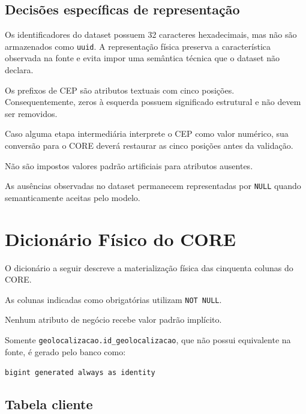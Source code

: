 \documentclass[12pt,a4paper]{article}
\begin{document}
	\subsection{Decisões específicas de representação}
	
	Os identificadores do dataset possuem 32 caracteres hexadecimais, mas
	não são armazenados como \texttt{uuid}. A representação física
	preserva a característica observada na fonte e evita impor uma
	semântica técnica que o dataset não declara.
	
	Os prefixos de CEP são atributos textuais com cinco posições.
	Consequentemente, zeros à esquerda possuem significado estrutural e
	não devem ser removidos.
	
	Caso alguma etapa intermediária interprete o CEP como valor numérico,
	sua conversão para o CORE deverá restaurar as cinco posições antes da
	validação.
	
	Não são impostos valores padrão artificiais para atributos ausentes.
	
	As ausências observadas no dataset permanecem representadas por
	\texttt{NULL} quando semanticamente aceitas pelo modelo.
	
	\section{Dicionário Físico do CORE}
	
	O dicionário a seguir descreve a materialização física das cinquenta
	colunas do CORE.
	
	As colunas indicadas como obrigatórias utilizam \texttt{NOT NULL}.
	
	Nenhum atributo de negócio recebe valor padrão implícito.
	
	Somente
	\texttt{geolocalizacao.id\_geolocalizacao},
	que não possui equivalente na fonte, é gerado pelo banco como:
	
	\begin{center}
		\texttt{bigint generated always as identity}
	\end{center}
	
	\subsection{Tabela cliente}
	
\end{document}

